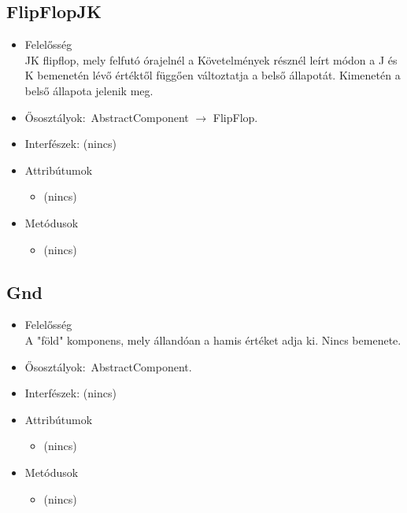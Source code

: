 \subsection{FlipFlopJK}
\begin{itemize}
\item Felelősség\\
JK flipflop, mely felfutó órajelnél a Követelmények résznél leírt módon a J és K bemenetén lévő értéktől függően változtatja a belső állapotát. Kimenetén a belső állapota jelenik meg.
\item Ősosztályok:\ AbstractComponent $\rightarrow{}$ FlipFlop.
\item Interfészek: (nincs)
\item Attribútumok $\ $
\begin{itemize}
\item (nincs)
\end{itemize}
\item Metódusok$\ $
\begin{itemize}
\item (nincs)
\end{itemize}
\end{itemize}

\subsection{Gnd}
\begin{itemize}
\item Felelősség\\
A "föld" komponens, mely állandóan a hamis értéket adja ki. Nincs bemenete.
\item Ősosztályok:\ AbstractComponent.
\item Interfészek: (nincs)
\item Attribútumok $\ $
\begin{itemize}
\item (nincs)
\end{itemize}
\item Metódusok$\ $
\begin{itemize}
\item (nincs)
\end{itemize}
\end{itemize}

